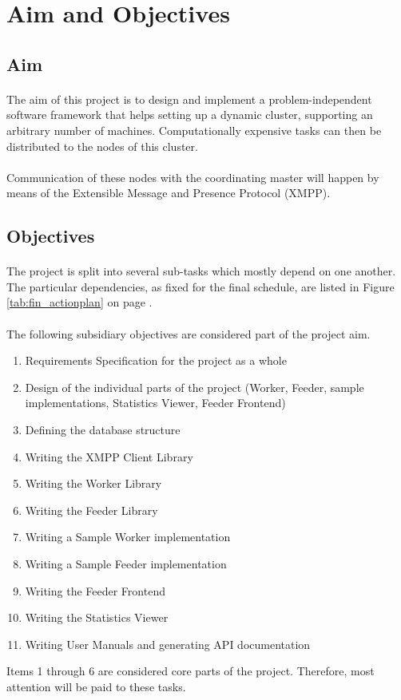 \section{Aim and Objectives}

\subsection{Aim}
\paragraph{}
The aim of this project is to design and implement a problem-independent software framework that helps setting up a dynamic cluster, supporting an arbitrary number of machines. Computationally expensive tasks can then be distributed to the nodes of this cluster.
\paragraph{}
Communication of these nodes with the coordinating master will happen by means of the Extensible Message and Presence Protocol (XMPP).

\subsection{Objectives}
\paragraph{}
The project is split into several sub-tasks which mostly depend on one another. The particular dependencies, as fixed for the final schedule, are listed in Figure \ref{tab:fin_actionplan} on page \pageref{tab:fin_actionplan}.

\paragraph{}
The following subsidiary objectives are considered part of the project aim.
\begin{enumerate}
\item Requirements Specification for the project as a whole
\item Design of the individual parts of the project (Worker, Feeder, sample implementations, Statistics Viewer, Feeder Frontend)
\item Defining the database structure
\item Writing the XMPP Client Library
\item Writing the Worker Library
\item Writing the Feeder Library
\item Writing a Sample Worker implementation
\item Writing a Sample Feeder implementation
\item Writing the Feeder Frontend
\item Writing the Statistics Viewer
\item Writing User Manuals and generating API documentation
\end{enumerate}
Items 1 through 6 are considered core parts of the project. Therefore, most attention will be paid to these tasks.

